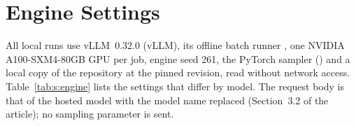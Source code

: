 \section{Engine Settings}
\label{sup:engine}

All local runs use vLLM~0.32.0 (vLLM), its offline batch runner , one NVIDIA A100-SXM4-80GB GPU per job, engine seed 261, the PyTorch sampler () and a local copy of the repository at the pinned revision, read without network access. Table~\ref{tab:s:engine} lists the settings that differ by model. The request body is that of the hosted model with the model name replaced (Section~3.2 of the article); no sampling parameter is sent.

